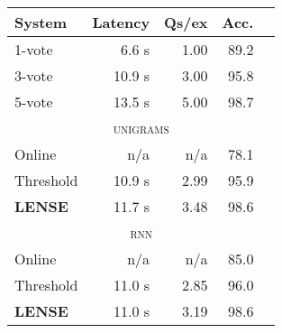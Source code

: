 \begin{tabular}{l  r  r  r  r}
    \textbf{System} & \textbf{Latency} & \textbf{Qs/ex} & \textbf{Acc.} \\ \hline
    1-vote & 6.6 s & 1.00 & 89.2 \\ %
    3-vote & 10.9 s & 3.00 & 95.8 \\ %
    5-vote & 13.5 s & 5.00 & 98.7 \\ %
    \multicolumn{5}{c}{\textsc{unigrams}} \\ \hline
    Online & n/a & n/a & 78.1 \\ %
    Threshold & 10.9 s & 2.99 & 95.9 \\ %
    \textbf{LENSE} & 11.7 s & 3.48 & 98.6 \\ %
    \multicolumn{5}{c}{\textsc{rnn}} \\ \hline
    Online & n/a & n/a & 85.0 \\ %
    Threshold & 11.0 s & 2.85 & 96.0 \\ %
    \textbf{LENSE} & 11.0 s & 3.19 & 98.6 \\%
\end{tabular}
